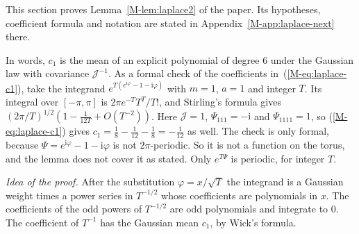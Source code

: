 \documentclass[EJP,preprint]{ejpecp}
\newcommand{\mref}[1]{\ref*{M-#1}}
\newcommand{\meqref}[1]{(\mref{#1})}
\begin{document}
This section proves Lemma~\mref{lem:laplace2} of the paper. Its hypotheses,
coefficient formula and notation are stated in Appendix~\mref{app:laplace-next} there.

In words, $c_1$ is the mean of an explicit polynomial of degree $6$ under the
Gaussian law with covariance $\mathcal J^{-1}$. As a formal check of the
coefficients in~\meqref{eq:laplace-c1}, take the integrand
$e^{T(e^{\mathrm i\varphi}-1-\mathrm i\varphi)}$ with $m=1$, $a=1$ and integer
$T$. Its integral over $[-\pi,\pi]$ is $2\pi e^{-T}T^T/T!$, and Stirling's
formula gives $(2\pi/T)^{1/2}(1-\frac1{12T}+O(T^{-2}))$. Here $\mathcal J=1$,
$\Psi_{111}=-\mathrm i$ and $\Psi_{1111}=1$, so \meqref{eq:laplace-c1} gives
$c_1=\frac18-\frac1{12}-\frac18=-\frac1{12}$ as well. The check is only
formal, because $\Psi=e^{\mathrm i\varphi}-1-\mathrm i\varphi$ is not
$2\pi$-periodic. So it is not a function on the torus, and the lemma does not
cover it as stated. Only $e^{T\Psi}$ is periodic, for integer $T$.

\emph{Idea of the proof.} After the substitution $\varphi=x/\sqrt T$ the
integrand is a Gaussian weight times a power series in $T^{-1/2}$ whose
coefficients are polynomials in $x$. The coefficients of the odd powers of
$T^{-1/2}$ are odd polynomials and integrate to $0$. The coefficient of
$T^{-1}$ has the Gaussian mean $c_1$, by Wick's formula.
\end{document}
